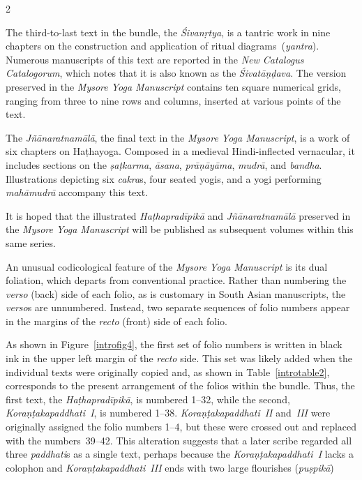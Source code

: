 \begin{nohyp}
\begin{multicols*}{2}
\begin{eng}
The third-to-last text in the bundle, the \emph{Śivanṛtya}, is a tantric work in nine chapters on the construction and application of ritual diagrams~(\emph{yantra}). Numerous manuscripts of this text are reported in the \emph{New Catalogus Catalogorum}, which notes that it is also known as the \emph{Śivatāṇḍava}. The version preserved in the \emph{Mysore Yoga Manuscript} contains ten square numerical grids, ranging from three to nine rows and columns, inserted at various points of the text.

The \emph{Jñānaratnamālā}, the final text in the \emph{Mysore Yoga Manuscript}, is a work of six chapters on Haṭhayoga. Composed in a medieval Hindi-inflected vernacular, it includes sections on the \emph{ṣaṭkarma}, \emph{āsana}, \emph{prāṇāyāma}, \emph{mudrā}, and \emph{bandha}. Illustrations depicting six \emph{cakra}s, four seated yogis, and a yogi performing \emph{mahāmudrā} accompany this text.

It is hoped that the illustrated \emph{Haṭhapradīpikā} and \emph{Jñānaratnamālā} preserved in the \emph{Mysore Yoga Manuscript} will be published as subsequent volumes within this same series.
\vskip 18pt

\label{introsec1.4}
\vskip 9pt

\noindent
An unusual codicological feature of the \emph{Mysore Yoga Manuscript} is its dual foliation, which departs from conventional practice. Rather than numbering the \emph{verso} (back) side of each folio, as is customary in South Asian manuscripts, the \emph{verso}s are unnumbered. Instead, two separate sequences of folio numbers appear in the margins of the \emph{recto} (front) side of each folio.

{\parfillskip=0pt
As shown in Figure~\ref{introfig4}, the first set of folio numbers is written in black ink in the upper left margin of the \emph{recto} side. This set was likely added when the individual texts were originally copied and, as shown in Table~\ref{introtable2}, corresponds to the present arrangement of the folios within the bundle. Thus, the first text, the \emph{Haṭhapradīpikā}, is numbered 1--32, while the second, \emph{Koraṇṭakapaddhati~I}, is numbered 1--38. \emph{Koraṇṭakapaddhati}~\emph{II} and~\emph{III} were originally assigned the folio numbers 1--4, but these were crossed out and replaced with the numbers~39--42. This alteration suggests that a later scribe regarded all three \emph{paddhati}s as a single text, perhaps because the \emph{Koraṇṭakapaddhati~I} lacks a colophon and \emph{Koraṇṭakapaddhati}~\emph{III} ends with two large flourishes (\emph{puṣpikā})\par}
\end{eng}
\end{multicols*}




\end{nohyp}
